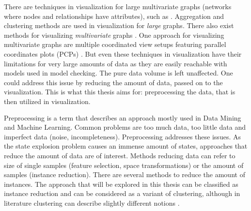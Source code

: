 \documentclass[preview]{standalone}
\begin{document}
There are techniques in visualization for large multivariate graphs (networks where nodes and relationships have attributes), such as \mdpsN. Aggregation and clustering methods are used in visualization for \emph{large} graphs\cite{Goerke2009}. There also exist methods for visualizing \emph{multivariate} graphs \cite{Kerren2014,Nobre2019}. One approach for visualizing multivariate graphs are multiple coordinated view setups featuring parallel coordinates plots (PCPs) \cite{Johansson2016}. But even these techniques in visualization have their limitations for very large amounts of data as they are easily reachable with models used in model checking. The pure data volume is left unaffected. One could address this issue by reducing the amount of data, passed on to the visualization. This is what this thesis aims for: preprocessing the data, that is then utilized in visualization.

Preprocessing is a term that describes an approach mostly used in Data Mining and Machine Learning. Common problems are too much data, too little data and imperfect data (noise, incompleteness)\cite{Garcia2016}. Preprocessing addresses these issues. As the state explosion problem causes an immense amount of states, approaches that reduce the amount of data are of interest. Methods reducing data can refer to size of single samples (feature selection, space transformations) or the amount of samples (instance reduction). There are several methods to reduce the amount of instances. The approach that will be explored in this thesis can be classified as instance reduction and can be considered as a variant of clustering, although in literature clustering can describe slightly different notions \cite{Alasadi2017,Baskar2013}.
\end{document}

